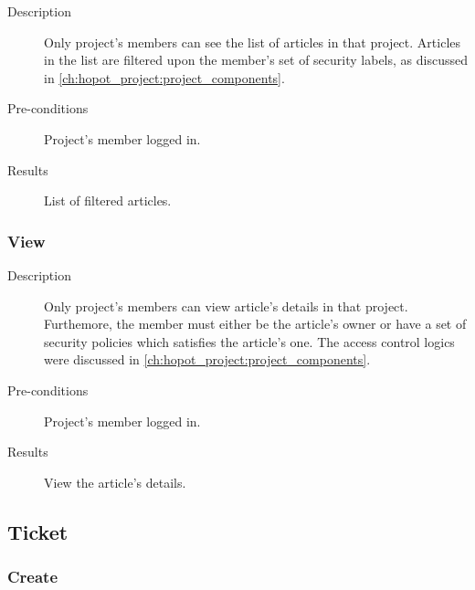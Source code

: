 \begin{description}
\item[Description] Only project's members can see the list of articles in that project.
Articles in the list are filtered upon the member's set of security labels, as discussed in \autoref{ch:hopot_project:project_components}.
\item[Pre-conditions] Project's member logged in.
\item[Results] List of filtered articles.
\end{description}

\subsubsection{View}
\label{ch:result:user_guide:article:list}

\begin{description}
\item[Description] Only project's members can view article's details in that project.
Furthemore, the member must either be the article's owner or have a set of security policies which satisfies the article's one.
The access control logics were discussed in \autoref{ch:hopot_project:project_components}.
\item[Pre-conditions] Project's member logged in.
\item[Results] View the article's details.
\end{description}

\subsection{Ticket}
\label{ch:result:user_guide:ticket}
\subsubsection{Create}
\label{ch:result:user_guide:ticket:create}

